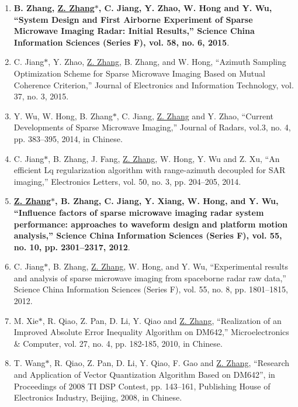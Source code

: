 \documentclass[paper=a4,fontsize=11pt]{scrartcl}
\begin{document}
\begin{enumerate}
\item \textbf{B. Zhang, \underline{Z. Zhang$\ast$}, C. Jiang, Y. Zhao, W. Hong and Y. Wu, ``System Design and First Airborne Experiment of Sparse Microwave Imaging Radar: Initial Results,'' Science China Information Sciences (Series F), vol. 58, no. 6, 2015}.

\item C. Jiang$\ast$, Y. Zhao, \underline{Z. Zhang}, B. Zhang, and W. Hong, ``Azimuth Sampling Optimization Scheme for Sparse Microwave Imaging Based on Mutual Coherence Criterion,'' Journal of Electronics and Information Technology, vol. 37, no. 3, 2015.

\item Y. Wu, W. Hong, B. Zhang$\ast$, C. Jiang, \underline{Z. Zhang} and Y. Zhao, ``Current Developments of Sparse Microwave Imaging,'' Journal of Radars, vol.3, no. 4, pp. 383--395, 2014, in Chinese.

\item C. Jiang$\ast$, B. Zhang, J. Fang, \underline{Z. Zhang}, W. Hong, Y. Wu and Z. Xu, ``An efficient Lq regularization algorithm with range-azimuth decoupled for SAR imaging,'' Electronics Letters, vol. 50, no. 3, pp. 204--205, 2014.

\item \textbf{\underline{Z. Zhang$\ast$}, B. Zhang, C. Jiang, Y. Xiang, W. Hong, and Y. Wu, ``Influence factors of sparse microwave imaging radar system performance: approaches to waveform design and platform motion analysis,'' Science China Information Sciences (Series F), vol. 55, no. 10, pp. 2301--2317, 2012}.

\item C. Jiang$\ast$, B. Zhang, \underline{Z. Zhang}, W. Hong, and Y. Wu, ``Experimental results and analysis of sparse microwave imaging from spaceborne radar raw data,'' Science China Information Sciences (Series F), vol. 55, no. 8, pp. 1801--1815, 2012.


\item M. Xie$\ast$, R. Qiao, Z. Pan, D. Li, Y. Qiao and \underline{Z. Zhang}, ``Realization of an Improved Absolute Error Inequality Algorithm on DM642,'' Microelectronics \& Computer, vol. 27, no. 4, pp. 182-185, 2010, in Chinese.

\item T. Wang$\ast$, R. Qiao, Z. Pan, D. Li, Y. Qiao, F. Gao and \underline{Z. Zhang}, ``Research and Application of Vector Quantization Algorithm Based on DM642'', in Proceedings of 2008 TI DSP Contest, pp. 143--161, Publishing House of Electronics Industry, Beijing, 2008, in Chinese. 

~\\
	
\end{enumerate}
\end{document}
